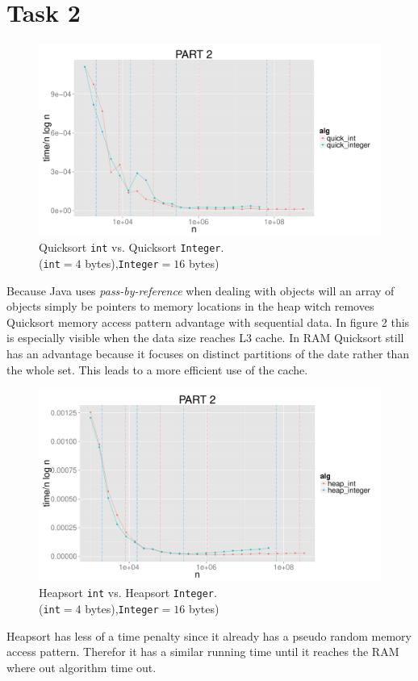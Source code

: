 \documentclass{article}
\begin{document}
\section*{Task 2}
\begin{figure}[H]
    \centering
    \includegraphics[width=
    \textwidth]{images/part2_quick.pdf}
    \caption{Quicksort \texttt{int} vs. Quicksort \texttt{Integer}. 
    \\(\texttt{int}$= 4$ bytes),\texttt{Integer}$= 16$ bytes)}
    \label{fig:awesome_image}
\end{figure}
Because Java uses \textit{pass-by-reference} when dealing with objects will an 
array of objects simply be pointers to memory locations in the heap witch 
removes Quicksort memory access pattern advantage with sequential data.
In figure 2 this is especially visible when the data size reaches L3 cache. In 
RAM Quicksort still has an advantage because it focuses on distinct partitions
of the date rather than the whole set. This leads to a more efficient use of the 
cache.
\begin{figure}[H]
    \centering
    \includegraphics[width=
    \textwidth]{images/part2_heap.pdf}
    \caption{Heapsort \texttt{int} vs. Heapsort \texttt{Integer}. 
    \\(\texttt{int}$= 4$ bytes),\texttt{Integer}$= 16$ bytes)}
    \label{fig:awesome_image}
\end{figure}
Heapsort has less of a time penalty since it already has a pseudo random memory 
access pattern. Therefor it has a similar running time until it reaches the RAM
where out algorithm time out. 
\newpage
\end{document}
